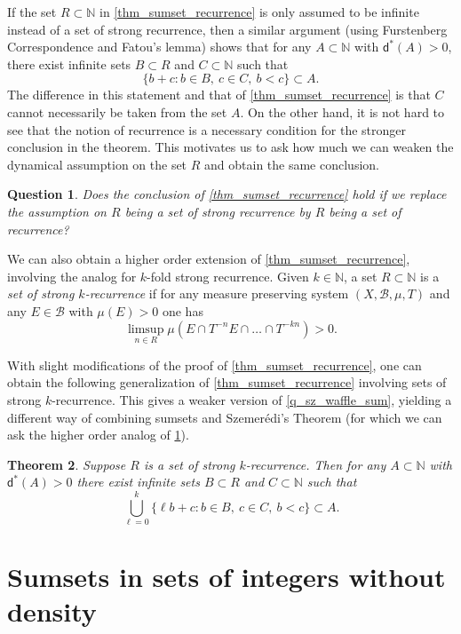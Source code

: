 \documentclass[10pt,dvipsnames]{article}
\newtheorem{theorem}{Theorem}[section]
\newtheorem{question}[theorem]{Question}
\theoremstyle{definition}
\theoremstyle{plain}
\newcommand{\define}[1]{\textit{#1}}
\newcommand{\N}{\mathbb{N}}
\newcommand{\ubdens}{\mathsf{d}^*}
\newcommand{\Szemeredi}{Szemer\'{e}di}
\begin{document}
If the set $R\subset\N$ in \cref{thm_sumset_recurrence} 
is only assumed to be infinite instead of a set of strong recurrence, then a similar argument (using Furstenberg Correspondence and Fatou's lemma) shows that for any $A\subset\N$ with $\ubdens(A)>0$, there exist  infinite sets $B\subset R$ and $C\subset\N$ such that
\[
\{b+c: b\in B,~c\in C,~b<c\}\subset A.
\]
The difference in this statement and that of \cref{thm_sumset_recurrence} is that $C$ cannot necessarily be taken from the set $A$.  On the other hand, it is not hard to see that the notion of recurrence is a necessary condition for the stronger conclusion in the theorem.  
 This motivates us to ask how much we can weaken the dynamical assumption on the set $R$ and obtain the same conclusion.  

\begin{question}
\label{q:weak}
Does the conclusion of \cref{thm_sumset_recurrence} hold if we replace the assumption on $R$ being a set of strong recurrence by $R$ being a set of recurrence? 
\end{question}

We can also obtain a higher order extension of \cref{thm_sumset_recurrence}, involving the analog for $k$-fold strong recurrence.  
Given $k\in\N$, a set $R\subset\N$ is a \define{set of strong $k$-recurrence} if for any measure preserving system $(X,\mathcal{B},\mu,T)$ and any $E\in \mathcal{B}$ with $\mu(E)>0$ one has
\[
\limsup_{n\in R} \mu(E\cap T^{-n}E\cap \ldots\cap T^{-kn})>0.
\]

With slight modifications of the proof of \cref{thm_sumset_recurrence}, one can obtain the following generalization of \cref{thm_sumset_recurrence} involving sets of strong $k$-recurrence. This gives a weaker version of \cref{q_sz_waffle_sum}, yielding a different way of combining sumsets and  \Szemeredi{}'s Theorem (for which we can ask the higher order analog of \cref{q:weak}).

\begin{theorem}
\label{thm_restricted_different_sumset_szemeredi}
Suppose $R$ is a set of strong $k$-recurrence. Then for any $A\subset\N$ with $\ubdens(A)>0$ there exist infinite sets $B\subset R$ and  $C\subset \N$ such that
\[
\bigcup_{\ell=0}^k\{\ell b+c: b\in B,~c\in C,~b<c\}\subset A.
\]
\end{theorem}






\section{Sumsets in sets of integers without  density}
\label{sec:more-general-infinite}
\end{document}
